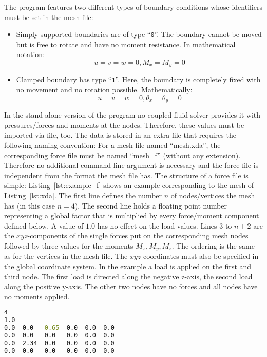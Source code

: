    The program features two different types of boundary conditions whose identifiers must be set in the mesh file:
   \begin{itemize}
   	\item Simply supported boundaries are of type ``\texttt{0}''. The boundary cannot be moved but is free to rotate and have no moment resistance. In mathematical notation:
   	\begin{equation*}
   	u = v = w = 0, M_x = M_y = 0
   	\end{equation*}
   	\item Clamped boundary has type ``\texttt{1}''. Here, the boundary is completely fixed with no movement and no rotation possible. Mathematically:
   	\begin{equation*}
   	u = v = w = 0, \theta_x = \theta_y = 0
   	\end{equation*}
   \end{itemize}
   In the stand-alone version of the program no coupled fluid solver provides it with pressures/forces and moments at the nodes. Therefore, these values must be imported via file, too. The data is stored in an extra file that requires the following naming convention: For a mesh file named ``mesh.xda'', the corresponding force file must be named ``mesh\_f'' (without any extension). Therefore no additional command line argument is necessary and the force file is independent from the format the mesh file has. The structure of a force file is simple: Listing~\ref{lst:example_f} shows an example corresponding to the mesh of Listing~\ref{lst:xda}. The first line defines the number $n$ of nodes/vertices the mesh has (in this case $n=4$). The second line holds a floating point number representing a global factor that is multiplied by every force/moment component defined below. A value of $1.0$ has no effect on the load values. Lines 3 to $n+2$ are the $xyz$-components of the single forces put on the corresponding mesh nodes followed by three values for the moments $M_x, M_y, M_z$. The ordering is the same as for the vertices in the mesh file. The $xyz$-coordinates must also be specified in the global coordinate system. In the example a load is applied on the first and third node. The first load is directed along the negative z-axis, the second load along the positive y-axis. The other two nodes have no forces and all nodes have no moments applied.
\begin{lstlisting}[caption=Example force file,label=lst:example_f,language=bash,keepspaces=true]
4
1.0
0.0  0.0  -0.65  0.0  0.0  0.0
0.0  0.0   0.0   0.0  0.0  0.0
0.0  2.34  0.0   0.0  0.0  0.0
0.0  0.0   0.0   0.0  0.0  0.0
\end{lstlisting}
   
